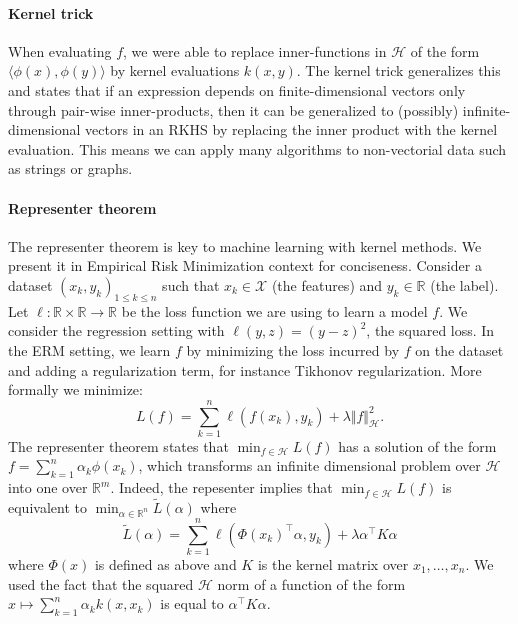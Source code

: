 \paragraph{Kernel trick}
When evaluating $f$, we were able to replace inner-functions in $\mathcal H$ of the form $\langle \phi(x), \phi(y)\rangle$ by kernel evaluations $k(x, y)$. The kernel trick generalizes this and states that if an expression depends on finite-dimensional vectors only through pair-wise inner-products, then it can be generalized to (possibly) infinite-dimensional vectors in an RKHS by replacing the inner product with the kernel evaluation. This means we can apply many algorithms to non-vectorial data such as strings or graphs.

\paragraph{Representer theorem} The representer theorem is key to machine learning with kernel methods. We present it in Empirical Risk Minimization context for conciseness. Consider a dataset $(x_k, y_k)_{1\leq k\leq n}$ such that $x_k\in\mathcal X$ (the features) and $y_k\in\mathbb R$ (the label). Let $\ell: \mathbb R \times\mathbb R\to\mathbb R$ be the loss function we are using to learn a model $f$. We consider the regression setting with $\ell(y, z) = (y - z) ^2$, the squared loss. In the ERM setting, we learn $f$ by minimizing the loss incurred by $f$ on the dataset and adding a regularization term, for instance Tikhonov regularization. More formally we minimize:
\begin{equation}
    L(f) = \sum_{k=1}^n \ell(f(x_k), y_k) + \lambda \Vert f \Vert_\mathcal H^2.
\end{equation}
The representer theorem states that $\min_{f\in\mathcal H}L(f)$ has a solution of the form $f= \sum_{k=1}^n \alpha_k \phi(x_k)$, which transforms an infinite dimensional problem over $\mathcal H$ into one over $\mathbb R^m$. Indeed, the repesenter implies that $\min_{f\in\mathcal H}L(f)$ is equivalent to $\min_{\alpha\in\mathbb R^n}\tilde L(\alpha)$ where
\begin{equation}
\tilde L(\alpha) = \sum_{k=1}^n \ell(\Phi(x_k)^\top\alpha, y_k) + \lambda \alpha^\top K \alpha
\end{equation} where $\Phi(x)$ is defined as above and $K$ is the kernel matrix over $x_1, \ldots, x_n$. We used the fact that the squared $\mathcal H$ norm of a function of the form $x \mapsto \sum_{k=1}^n \alpha_k k(x, x_k)$ is equal to $\alpha^\top K \alpha$.

